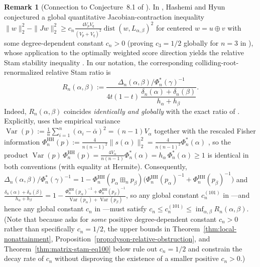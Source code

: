 \documentclass[11pt,a4paper]{article}
\theoremstyle{definition}
\newtheorem{remark}[theorem]{Remark}
\DeclareMathOperator{\Var}{Var}
\newcommand{\boxplusn}{\boxplus_n}
\begin{document}
\begin{remark}[Connection to Conjecture~8.1 of \cite{HH2026}]
\label{rem:hh-conj81}
In \cite[Conjecture~8.1 / eq.~(100)]{HH2026}, Hashemi and Hyun conjectured a global quantitative Jacobian-contraction inequality $\|w\|_2^2 - \|J w\|_2^2 \ge c_n \frac{4V_p V_q}{(V_p+V_q)^2}\operatorname{dist}(w, L_{\alpha,\beta})^2$ for centered $w = u \oplus v$ with some degree-dependent constant $c_n > 0$ (proving $c_3 = 1/2$ globally for $n=3$ in \cite[\S 8]{HH2026}), whose application to the optimally weighted score direction yields the relative Stam stability inequality \cite[eq.~(101)]{HH2026}. In our notation, the corresponding colliding-root-renormalized relative Stam ratio is
\begin{equation}
\label{eq:rel-stam-ratio}
R_n(\alpha, \beta) := \frac{\Delta_n(\alpha, \beta) / \Phi_n^*(\gamma)^{-1}}{4t(1-t)\, \dfrac{\delta_n(\alpha) + \delta_n(\beta)}{h_\alpha + h_\beta}}.
\end{equation}
Indeed, $R_n(\alpha, \beta)$ coincides \emph{identically and globally} with the exact ratio of \cite[eq.~(101)]{HH2026}. Explicitly, \cite{HH2026} uses the empirical variance $\Var(p) := \frac{1}{n}\sum_{i=1}^n (\alpha_i - \bar{\alpha})^2 = (n-1) V_\alpha$ together with the rescaled Fisher information $\Phi_n^{\mathrm{HH}}(p) := \frac{4}{n(n-1)^2}\|s(\alpha)\|_2^2 = \frac{4}{n(n-1)^2}\Phi_n^*(\alpha)$ \cite[eq.~(1)]{HH2026}, so the product $\Var(p)\,\Phi_n^{\mathrm{HH}}(p) = \frac{4 V_\alpha}{n(n-1)}\Phi_n^*(\alpha) = h_\alpha\,\Phi_n^*(\alpha) \ge 1$ is identical in both conventions (with equality at Hermite). Consequently, $\Delta_n(\alpha,\beta)/\Phi_n^*(\gamma)^{-1} = 1 - \Phi_n^{\mathrm{HH}}(p_\alpha \boxplusn p_\beta)\big(\Phi_n^{\mathrm{HH}}(p_\alpha)^{-1} + \Phi_n^{\mathrm{HH}}(p_\beta)^{-1}\big)$ and $\frac{\delta_n(\alpha)+\delta_n(\beta)}{h_\alpha + h_\beta} = 1 - \frac{\Phi_n^{\mathrm{HH}}(p_\alpha)^{-1} + \Phi_n^{\mathrm{HH}}(p_\beta)^{-1}}{\Var(p_\alpha) + \Var(p_\beta)}$, so any global constant $c_n^{(101)}$ in \cite[eq.~(101)]{HH2026}---and hence any global constant $c_n$ in \cite[Conjecture~8.1 / eq.~(100)]{HH2026}---must satisfy $c_n \le c_n^{(101)} \le \inf_{\alpha,\beta} R_n(\alpha,\beta)$. (Note that because \cite[Conjecture~8.1]{HH2026} asks for \emph{some} positive degree-dependent constant $c_n > 0$ rather than specifically $c_n = 1/2$, the upper bounds in Theorem~\ref{thm:local-nonattainment}, Proposition~\ref{prop:dyson-relative-obstruction}, and Theorem~\ref{thm:matrix-stam-eq100} below rule out $c_n = 1/2$ and constrain the decay rate of $c_n$ without disproving the existence of a smaller positive $c_n > 0$.)


\end{remark}
\end{document}
